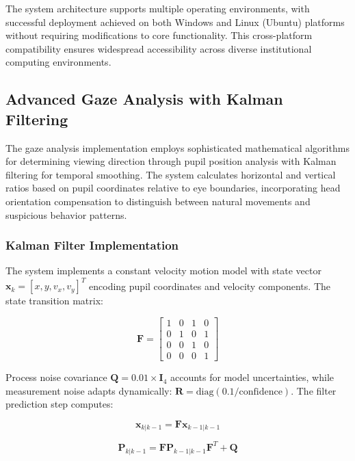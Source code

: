 \documentclass[conference]{IEEEtran}
\begin{document}
The system architecture supports multiple operating environments, with successful 
deployment achieved on both Windows and Linux (Ubuntu) platforms without requiring 
modifications to core functionality. This cross-platform compatibility ensures 
widespread accessibility across diverse institutional computing environments.

\subsection{Advanced Gaze Analysis with Kalman Filtering}

The gaze analysis implementation employs sophisticated mathematical algorithms for determining viewing direction through pupil position analysis with Kalman filtering for temporal smoothing\cite{kalman1960new}. The system calculates horizontal and vertical ratios based on pupil coordinates relative to eye boundaries, incorporating head orientation compensation to distinguish between natural movements and suspicious behavior patterns\cite{bar2001estimation}.

\subsubsection{Kalman Filter Implementation}

The system implements a constant velocity motion model with state vector $\mathbf{x}_k = [x, y, v_x, v_y]^T$ encoding pupil coordinates and velocity components. The state transition matrix:

\begin{equation}
\mathbf{F} = \begin{bmatrix}
1 & 0 & 1 & 0 \\
0 & 1 & 0 & 1 \\
0 & 0 & 1 & 0 \\
0 & 0 & 0 & 1
\end{bmatrix}
\end{equation}

Process noise covariance $\mathbf{Q} = 0.01 \times \mathbf{I}_4$ accounts for model uncertainties, while measurement noise adapts dynamically: $\mathbf{R} = \text{diag}(0.1/\text{confidence})$. The filter prediction step computes:

\begin{equation}
\mathbf{x}_{k|k-1} = \mathbf{F}\mathbf{x}_{k-1|k-1}
\end{equation}

\begin{equation}
\mathbf{P}_{k|k-1} = \mathbf{F}\mathbf{P}_{k-1|k-1}\mathbf{F}^T + \mathbf{Q}
\end{equation}
\end{document}
